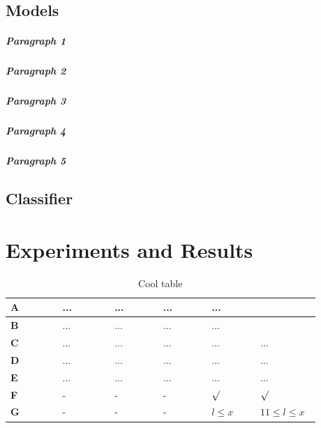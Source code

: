 \documentclass[12pt,twoside,a4paper,parskip]{scrbook} %
\begin{document}
\section{Models}
\lipsum[3]
\paragraph{Paragraph 1} \lipsum[1]

\paragraph{Paragraph 2} \lipsum[1]

\paragraph{Paragraph 3} \lipsum[1]

\paragraph{Paragraph 4} \lipsum[1]

\paragraph{Paragraph 5} \lipsum[1]
\newpage
\section{Classifier}\label{sec:knn}
\lipsum[1-3]

\chapter{Experiments and Results} \label{chapter:experimentsresults} 
\lipsum[3]
\begin{table}[H]
	\begin{center}
		\def\arraystretch{2}
		\begin{tabular}{p{0.155\linewidth}|p{0.15\linewidth}|p{0.145\linewidth}|p{0.14\linewidth}|p{0.14\linewidth}|p{0.15\linewidth}}
			\textbf{A}& ...	&...	&... &...  \\
			\hline \textbf{B} &...&...&... &... \\
			\hline \textbf{C} & ... &... &... &... &... \\
			\hline \textbf{D} & ... &...&... &... &... \\
			\hline \textbf{E} & ... &... &... &... &... \\
			\hline \textbf{F} & - &- &- &$\surd$  &$\surd$  \\
			\hline \textbf{G} & - & -& - & $l \leq x$ & $11 \leq l \leq x$\\
		\end{tabular}
	\end{center}
	\caption{Cool table}
	\label{tab:cool_table}
\end{table}
\end{document}
